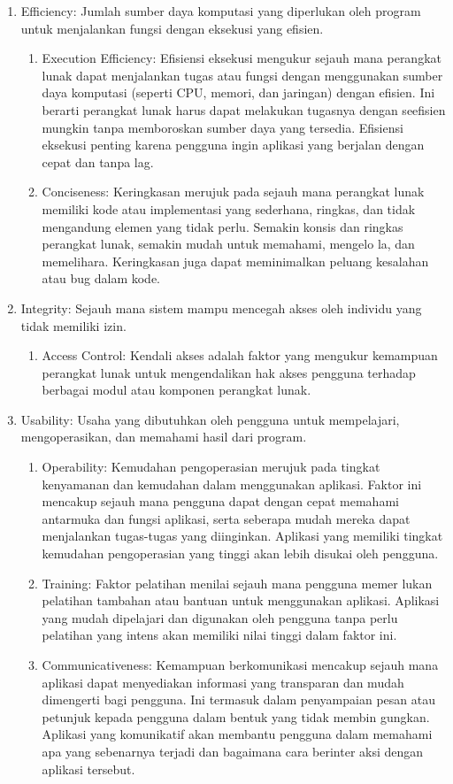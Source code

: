 \begin{enumerate}
	\item Efficiency: Jumlah sumber daya komputasi yang diperlukan oleh program untuk menjalankan fungsi dengan eksekusi yang efisien. 
	\begin{enumerate}[label=(\alph*)]
		\item Execution Efficiency: Efisiensi eksekusi mengukur sejauh mana perangkat lunak dapat menjalankan tugas atau fungsi dengan menggunakan sumber daya komputasi (seperti CPU, memori, dan jaringan) dengan efisien. Ini berarti perangkat lunak harus dapat melakukan tugasnya dengan seefisien mungkin tanpa memboroskan sumber daya yang tersedia. Efisiensi eksekusi penting karena pengguna ingin aplikasi yang berjalan dengan cepat dan tanpa lag. 
		\item Conciseness: Keringkasan merujuk pada sejauh mana perangkat lunak memiliki kode atau implementasi yang sederhana, ringkas, dan tidak mengandung elemen yang tidak perlu. Semakin konsis dan ringkas perangkat lunak, semakin mudah untuk memahami, mengelo la, dan memelihara. Keringkasan juga dapat meminimalkan peluang kesalahan atau bug dalam kode. 
\end{enumerate}
	\item Integrity: Sejauh mana sistem mampu mencegah akses oleh individu yang tidak memiliki izin. 
	\begin{enumerate}[label=(\alph*)]
		\item Access Control: Kendali akses adalah faktor yang mengukur kemampuan perangkat lunak untuk mengendalikan hak akses pengguna terhadap berbagai modul atau komponen perangkat lunak. 
\end{enumerate}
	\item Usability: Usaha yang dibutuhkan oleh pengguna untuk mempelajari, mengoperasikan, dan memahami hasil dari program. 
	\begin{enumerate}[label=(\alph*)]
		\item Operability: Kemudahan pengoperasian merujuk pada tingkat kenyamanan dan kemudahan dalam menggunakan aplikasi. Faktor ini mencakup sejauh mana pengguna dapat dengan cepat memahami antarmuka dan fungsi aplikasi, serta seberapa mudah mereka dapat menjalankan tugas-tugas yang diinginkan. Aplikasi yang memiliki tingkat kemudahan pengoperasian yang tinggi akan lebih disukai oleh pengguna. 
		\item Training: Faktor pelatihan menilai sejauh mana pengguna memer lukan pelatihan tambahan atau bantuan untuk menggunakan aplikasi. Aplikasi yang mudah dipelajari dan digunakan oleh pengguna tanpa perlu pelatihan yang intens akan memiliki nilai tinggi dalam faktor ini. 
		\item Communicativeness: Kemampuan berkomunikasi mencakup sejauh mana aplikasi dapat menyediakan informasi yang transparan dan mudah dimengerti bagi pengguna. Ini termasuk dalam penyampaian pesan atau petunjuk kepada pengguna dalam bentuk yang tidak membin gungkan. Aplikasi yang komunikatif akan membantu pengguna dalam memahami apa yang sebenarnya terjadi dan bagaimana cara berinter aksi dengan aplikasi tersebut. 
\end{enumerate}
\end{enumerate}
